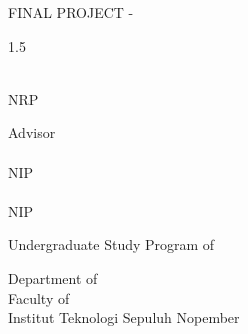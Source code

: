 \begin{large}
  FINAL PROJECT - \coursecode{}
\end{large}

\vspace{\fill}

\begin{spacing}{1.5}
  \begin{Large}
    \engtatitle{}
  \end{Large}
\end{spacing}

\vspace{\fill}

\begin{large}
  \name{} \\
  \textmd{NRP \nrp{}}
\end{large}

\vspace{\fill}

\begin{large}
  \textmd{Advisor} \\
  \advisor{} \\
  \textmd{NIP \advisornip{}} \\
  \coadvisor{} \\
  \textmd{NIP \coadvisornip{}}
\end{large}

\vspace{\fill}

Undergraduate Study Program of \engstudyprogram{} \\

\mdseries

Department of \engdepartment{} \\
Faculty of \engfaculty{} \\
Institut Teknologi Sepuluh Nopember

\place{} \\ \the\year{}
